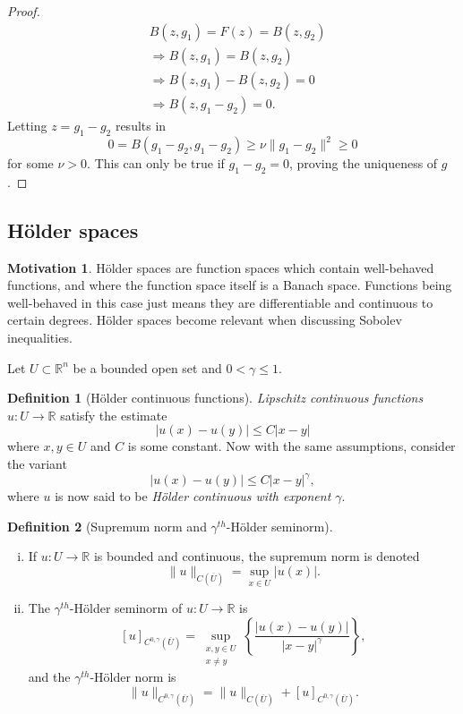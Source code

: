 \documentclass[11pt]{article}
\theoremstyle{definition}
\newtheorem*{definition}{Definition}
\newtheorem*{motivation}{Motivation}
\begin{document}
\begin{proof}
\begin{equation*}
		\begin{aligned}
			&B(z,g_1) = F(z) = B(z,g_2) \\
			&\Rightarrow B(z,g_1) = B(z,g_2) \\
			&\Rightarrow B(z,g_1) - B(z,g_2) = 0 \\
			&\Rightarrow B(z,g_1 - g_2) = 0.
		\end{aligned}
	\end{equation*}
	Letting $z= g_1 - g_2$ results in
	\begin{equation*}
		0 = B(g_1 - g_2, g_1 - g_2) \geq \nu \|g_1 - g_2\|^2 \geq 0
	\end{equation*}
	for some $\nu >0$. This can only be true if $g_1 - g_2 = 0$, proving the uniqueness of $g$.
\end{proof}

\newpage

\subsection{H\"{o}lder spaces}
\begin{motivation}
	H\"{o}lder spaces are function spaces which contain well-behaved functions, and where the function space itself is a Banach space.
	Functions being well-behaved in this case just means they are differentiable and continuous to certain degrees.
	H\"{o}lder spaces become relevant when discussing Sobolev inequalities.
\end{motivation}
Let $U \subset \mathbb{R}^n$ be a bounded open set and $0 < \gamma \leq 1$.
\begin{definition}[H\"{o}lder continuous functions]
\textit{Lipschitz continuous functions} $u : U \rightarrow \mathbb{R}$
satisfy the estimate
\[|u(x) - u(y)| \leq C|x-y|\]
where $x,y \in U$ and $C$ is some constant.
Now with the same assumptions, consider the variant
\[|u(x) - u(y)| \leq C|x-y|^{\gamma},\]
where $u$ is now said to be \textit{H\"{o}lder continuous with exponent $\gamma$}.
\end{definition}

\begin{definition}[Supremum norm and $\gamma^{th}$-H\"{o}lder seminorm]~ 
\begin{enumerate}[(i)]
\item If $u : U \rightarrow \mathbb{R}$ is bounded and continuous, the supremum norm is denoted
\[\|u\|_{C(\overline{U})} = \sup_{x \in U}{|u(x)|}.\]

\item The $\gamma^{th}$-H\"{o}lder seminorm of $u : U \rightarrow \mathbb{R}$ is
\[[u]_{C^{0,\gamma}(\overline{U})} = \sup_{\substack{x,y\in U \\ x\not= y}}\left\{\frac{|u(x) - u(y)|}{|x-y|^{\gamma}}\right\},\]
and the $\gamma^{th}$-H\"{o}lder norm is
\[\|u\|_{C^{0,\gamma}(\overline{U})} = \|u\|_{C(\overline{U})} + [u]_{C^{0,\gamma}(\overline{U})}.\]
\end{enumerate}
\end{definition}
\end{document}
